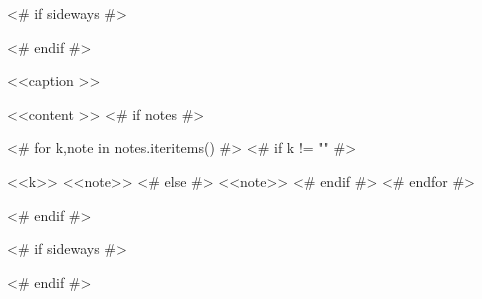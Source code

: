 \begin{<< env  >>}
  \centering
  <# if sideways #>
  \begin{adjustbox}{angle=90}
  <# endif #>
  \begin{threeparttable}
    \caption{<<caption >>}
    <<content >>
    <# if notes #>
    \begin{tablenotes}
      <# for k,note in notes.iteritems() #>
      <# if k != "" #>
      \item [<<k>>] <<note>>
      <# else #>
      <<note>>
      <# endif #>
      <# endfor #>
    \end{tablenotes}
    <# endif #>
  \end{threeparttable}
  <# if sideways #>
  \end{adjustbox}
  <# endif #>
  \label{tab:<<label >>}
\end{<< env  >>}
